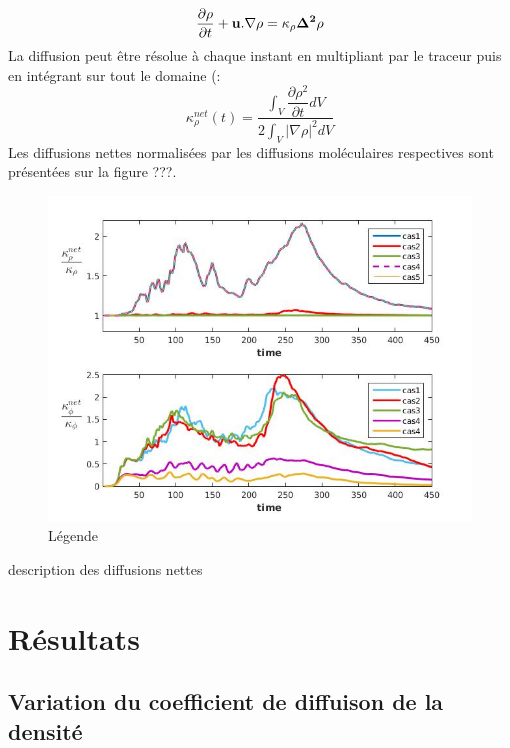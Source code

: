 \documentclass[a4paper,12pt]{article}
\begin{document}
    \begin{equation}
        \label{}
        \frac{\partial \rho}{\partial t} + \bf u.\nabla\rho = \kappa_{\rho}\Delta^2\rho
    \end{equation}
    La diffusion peut être résolue à chaque instant en multipliant par le traceur puis en intégrant sur tout le domaine (\cite{penney_diapycnal_2020}:
    \begin{equation}
        \kappa_{\rho}^{net}(t)= \frac{\int_V \dfrac{\partial\rho^2}{\partial t}dV}{2\int_V |\nabla\rho|^2dV}
    \end{equation}
    Les diffusions nettes normalisées par les diffusions moléculaires respectives sont présentées sur la figure ???.
    \begin{figure}[!h]
        \centering
        \label{kappanet}
        \includegraphics[width=0.9\linewidth]{figures/kappanet.jpg}
        \caption{Légende}
    \end{figure}
    \color{blue}
    description des diffusions nettes
    \color{black}

\newpage
\section{Résultats}

  \subsection{Variation du coefficient de diffuison de la densité}
  
\end{document}
